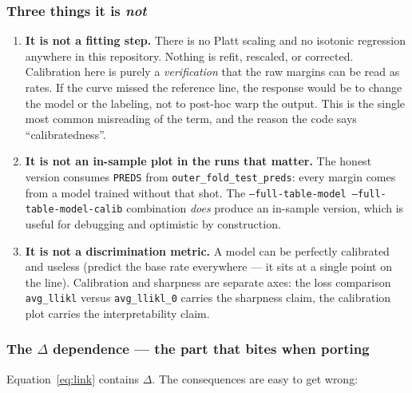 \documentclass[11pt,a4paper]{article}
\newcommand{\code}[1]{\texttt{\small #1}}
\begin{document}
\subsubsection*{Three things it is \emph{not}}

\begin{enumerate}[leftmargin=2em]
\item \textbf{It is not a fitting step.} There is no Platt scaling and no isotonic regression
anywhere in this repository. Nothing is refit, rescaled, or corrected. Calibration here is purely a
\emph{verification} that the raw margins can be read as rates. If the curve missed the reference
line, the response would be to change the model or the labeling, not to post-hoc warp the output.
This is the single most common misreading of the term, and the reason the code says
``calibratedness''.
\item \textbf{It is not an in-sample plot in the runs that matter.} The honest version consumes
\code{PREDS} from \code{outer\_fold\_test\_preds}: every margin comes from a model trained without
that shot. The \code{--full-table-model --full-table-model-calib} combination \emph{does} produce an
in-sample version, which is useful for debugging and optimistic by construction.
\item \textbf{It is not a discrimination metric.} A model can be perfectly calibrated and useless
(predict the base rate everywhere --- it sits at a single point on the line). Calibration and
sharpness are separate axes: the loss comparison \code{avg\_llikl} versus \code{avg\_llikl\_0}
carries the sharpness claim, the calibration plot carries the interpretability claim.
\end{enumerate}

\subsubsection*{The $\Delta$ dependence --- the part that bites when porting}

Equation~\eqref{eq:link} contains $\Delta$. The consequences are easy to get wrong:
\end{document}
